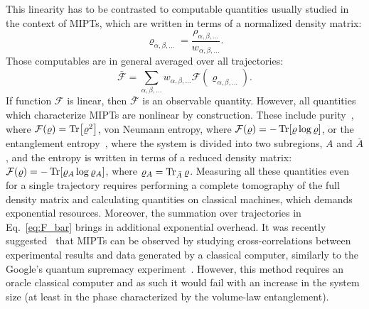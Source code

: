 \documentclass[%
 reprint,
 superscriptaddress,
 amsmath,amssymb,
prx,
]{revtex4-2}\href{\href{}{}}{}
\begin{document}
This linearity has to be contrasted to computable quantities usually studied in the context of MIPTs, which are written in terms of a normalized density matrix:
\begin{equation}
    \varrho _{\alpha,\beta,...} = \frac{\rho_{\alpha,\beta,...}}{w_{\alpha,\beta,...}}.
\end{equation}
Those computables are in general averaged over all trajectories:
\begin{equation}
    \bar{\mathcal F} = \sum_{\alpha,\beta,...}w_{\alpha,\beta,...}  \mathcal F(\varrho _{\alpha,\beta,...}).
    \label{eq:F_bar}
\end{equation}
If function $\mathcal F$ is linear, then $\bar{\mathcal F}$ is an observable quantity.
However, all quantities which characterize MIPTs are nonlinear by construction.
These include purity~\cite{Gullans2020_1,Fidkowski2021}, where $\mathcal F (\varrho)=\Tr[\varrho^2]$, von Neumann entropy, where $\mathcal F (\varrho)=-\Tr[\varrho \log\varrho]$, or the entanglement entropy~\cite{Li2018,Skinner2019,Li2019}, where the system is divided into two subregions, $A$ and $\bar A$, and the entropy is written in terms of a reduced density matrix: $\mathcal F (\varrho)=-\Tr[\varrho_A\log\varrho_A ]$, where $\varrho_A=\Tr_{\bar A}\varrho$.
Measuring all these quantities even for a single trajectory requires performing a complete tomography of the full density matrix and calculating quantities on classical machines, which demands exponential resources.
Moreover, the summation over trajectories in Eq.~\eqref{eq:F_bar} brings in additional exponential overhead.
It was recently suggested~\cite{Li2023,Hoke2023,Garratt2024} that MIPTs can be observed by studying cross-correlations between experimental results and data generated by a classical computer, similarly to the Google's quantum supremacy experiment~\cite{Arute2019}.
However, this method requires an oracle classical computer and as such it would fail with an increase in the system size (at least in the phase characterized by the volume-law entanglement).
\end{document}
